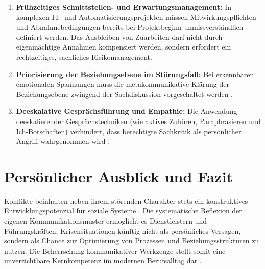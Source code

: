 \begin{enumerate}
    \item \textbf{Frühzeitiges Schnittstellen- und Erwartungsmanagement:} In komplexen IT- und Automatisierungsprojekten müssen Mitwirkungspflichten und Abnahmebedingungen bereits bei Projektbeginn unmissverständlich definiert werden. Das Ausbleiben von Zuarbeiten darf nicht durch eigenmächtige Annahmen kompensiert werden, sondern erfordert ein rechtzeitiges, sachliches Risikomanagement.
    \item \textbf{Priorisierung der Beziehungsebene im Störungsfall:} Bei erkennbaren emotionalen Spannungen muss die metakommunikative Klärung der Beziehungsebene zwingend der Sachdiskussion vorgeschaltet werden \cite[S.~12]{3}.
    \item \textbf{Deeskalative Gesprächsführung und Empathie:} Die Anwendung deeskalierender Gesprächstechniken (wie aktives Zuhören, Paraphrasieren und Ich-Botschaften) verhindert, dass berechtigte Sachkritik als persönlicher Angriff wahrgenommen wird \cite[S.~50--51]{5}.
\end{enumerate}

\section{Persönlicher Ausblick und Fazit}
Konflikte beinhalten neben ihrem störenden Charakter stets ein konstruktives Entwicklungspotenzial für soziale Systeme \cite[S.~10--12]{5}. Die systematische Reflexion der eigenen Kommunikationsmuster ermöglicht es Dienstleistern und Führungskräften, Krisensituationen künftig nicht als persönliches Versagen, sondern als Chance zur Optimierung von Prozessen und Beziehungsstrukturen zu nutzen. Die Beherrschung kommunikativer Werkzeuge stellt somit eine unverzichtbare Kernkompetenz im modernen Berufsalltag dar \cite[S.~1]{3}.

